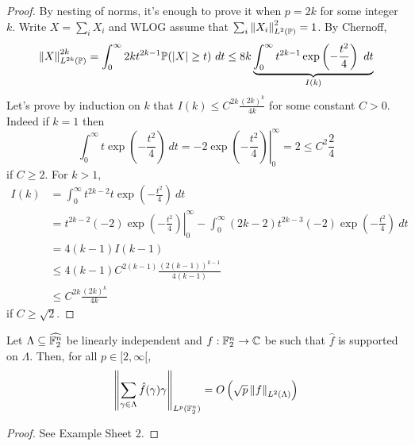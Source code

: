 \documentclass{article}
\begin{document}
\begin{proof}
  By nesting of norms, it's enough to prove it when $p = 2k$ for some integer $k$. Write $X = \sum_i X_i$ and WLOG assume that $\sum_i \left\lVert X_i\right\rVert_{L^2(\mathbb P)}^2 = 1$. By Chernoff,
  $$\left\lVert X\right\rVert_{L^{2k}(\mathbb P)}^{2k} = \int_0^\infty 2k t^{2k - 1} \mathbb P(\left\lvert X\right\rvert \ge t)\ dt \le 8k \underbrace{\int_0^\infty t^{2k - 1} \exp\left(-\frac{t^2}4\right)\ dt}_{I(k)}$$
  Let's prove by induction on $k$ that $I(k) \le C^{2k}\frac{(2k)^k}{4k}$ for some constant $C > 0$. Indeed if $k = 1$ then
  $$\int_0^\infty t \exp\left(-\frac{t^2}4\right)\ dt = \left. -2\exp\left(-\frac{t^2}4\right)\right|_0^\infty = 2 \le C^2 \frac 24$$
  if $C \ge 2$. For $k > 1$,
  \begin{align*}
    I(k)
    & = \int_0^\infty t^{2k - 2} t \exp\left(-\frac{t^2}4\right)\ dt \\
    & = \left. t^{2k - 2} (-2)\exp\left(-\frac{t^2}4\right)\right|_0^\infty - \int_0^\infty (2k - 2)t^{2k - 3}(-2)\exp\left(-\frac{t^2}4\right)\ dt \\
    & = 4(k - 1)I(k - 1) \\
    & \le 4(k - 1)C^{2(k - 1)}\frac{(2(k - 1))^{k - 1}}{4(k - 1)} \\
    & \le C^{2k}\frac{(2k)^k}{4k}
  \end{align*}
  if $C \ge \sqrt 2$.
\end{proof}

\begin{cor}
  Let $\Lambda \subseteq \widehat{\mathbb F_2^n}$ be linearly independent and $f : \mathbb F_2^n \to \mathbb C$ be such that $\hat f$ is supported on $\Lambda$. Then, for all $p \in [2, \infty[$,
  $$\left\lVert \sum_{\gamma \in \Lambda} \hat f(\gamma)\gamma\right\rVert_{L^p(\mathbb F_2^n)} = O\left(\sqrt p \left\lVert f\right\rVert_{L^2(\Lambda)}\right)$$
\end{cor}
\begin{proof}
  See Example Sheet 2.
\end{proof}
\end{document}
